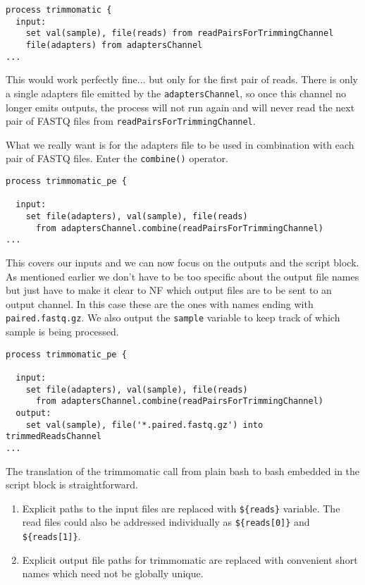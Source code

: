 \begin{lstlisting}
process trimmomatic {
  input:
    set val(sample), file(reads) from readPairsForTrimmingChannel
    file(adapters) from adaptersChannel
...    
\end{lstlisting}

This would work perfectly fine... but only for the first pair of reads. 
There is only a single adapters file emitted by the \texttt{adaptersChannel}, 
so once this channel no longer emits outputs, the process will not run again
and will never read the next pair of FASTQ files from \texttt{readPairsForTrimmingChannel}.

What we really want is for the adapters file to be used in combination with 
each pair of FASTQ files. Enter the \texttt{combine()} operator.

\begin{lstlisting}
process trimmomatic_pe {

  input:
    set file(adapters), val(sample), file(reads) 
      from adaptersChannel.combine(readPairsForTrimmingChannel)
...
\end{lstlisting}

This covers our inputs and we can now focus on the outputs and the script block.
As mentioned earlier we don't have to be too specific about the output file names 
but just have to make it clear to NF which output files are to be sent to an output channel.
In this case these are the ones with names ending with \texttt{paired.fastq.gz}.
We also output the \texttt{sample} variable to keep track of which sample is being processed.

\begin{lstlisting}
process trimmomatic_pe {

  input:
    set file(adapters), val(sample), file(reads) 
      from adaptersChannel.combine(readPairsForTrimmingChannel)
  output:
    set val(sample), file('*.paired.fastq.gz') into trimmedReadsChannel
...
\end{lstlisting}

The translation of the trimmomatic call from plain bash to bash embedded in the script block 
is straightforward. 

\begin{enumerate}
 \item Explicit paths to the input files are replaced with \texttt{\$\{reads\}} variable. The read files could also be addressed individually as \texttt{\$\{reads[0]\}} and \texttt{\$\{reads[1]\}}.
 \item Explicit output file paths for trimmomatic are replaced with convenient short names which need not be globally unique. 
\end{enumerate}



